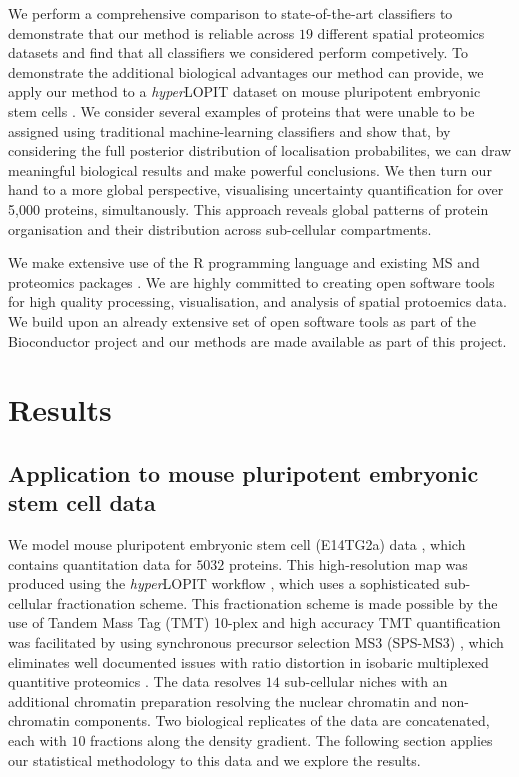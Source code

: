 \documentclass[12pt,english]{article}
\begin{document}
We perform a comprehensive comparison to state-of-the-art classifiers to demonstrate that our method is reliable across $19$ different spatial proteomics datasets and find that all classifiers we considered perform competively. To demonstrate
the additional biological advantages our method can provide, we apply our method to a \textit{hyper}LOPIT
dataset on mouse pluripotent embryonic stem cells \citep{hyper}. We consider several examples of proteins
that were unable to be assigned using traditional machine-learning classifiers and show that, by considering
the full posterior distribution of localisation probabilites, we can draw meaningful biological results and
make powerful conclusions. We then turn our hand to a more global perspective, visualising uncertainty quantification for over 5,000 proteins, simultanously. This approach reveals global patterns of protein organisation and their distribution across sub-cellular compartments.

We make extensive use of the R programming language \citep{R} and
existing MS and proteomics packages \citep{MSnbase:2012,
  pRoloc:2014}. We are highly committed to creating open software
tools for high quality processing, visualisation, and analysis of
spatial protoemics data.  We build upon an already extensive set of
open software tools \citep{pRoloc:2014} as part of the Bioconductor
project \citep{Bioconductor::2004, Huber::2015} and our methods are
made available as part of this project.

\section{Results}

\subsection{Application to mouse pluripotent embryonic stem cell data}

We model mouse pluripotent embryonic stem cell (E14TG2a) data  \citep{hyper}, which
contains quantitation data for $5032$ proteins. This high-resolution map was
produced using the \textit{hyper}LOPIT workflow \citep{Mulvey:2017}, which uses a sophisticated
sub-cellular fractionation scheme. This fractionation scheme is made possible
by the use of Tandem Mass Tag (TMT) 10-plex and high accuracy TMT quantification
was facilitated by using synchronous precursor selection MS3 (SPS-MS3) \citep{Mcalister::2014},
which eliminates well documented issues with ratio distortion in isobaric multiplexed quantitive proteomics
\citep{Ting:2011}. The data resolves
$14$ sub-cellular niches with an additional chromatin preparation
resolving the nuclear chromatin and non-chromatin components. Two
biological replicates of the data are concatenated, each with $10$ fractions
along the density gradient. The following section applies our statistical
methodology to this data and we explore the results.
\end{document}
